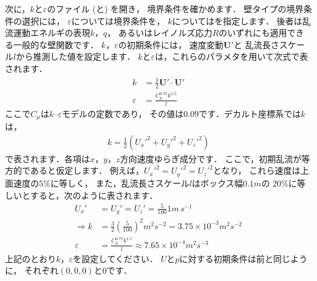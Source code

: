 次に，$k$と$\varepsilon$のファイル (と) を開き，
境界条件を確かめます．
壁タイプの境界条件の選択には，
$\varepsilon$については境界条件を，
$k$についてはを指定します．
後者は乱流運動エネルギの表現$k$，$q$，
あるいはレイノルズ応力$R$のいずれにも適用できる一般的な壁関数です．
$k$，$\varepsilon$の初期条件には，
速度変動$\bm{U}'$と
%
乱流長さスケール$l$から推測した値を設定します．
$k$と$\varepsilon$は，これらのパラメタを用いて次式で表されます．
\begin{align}
 \label{eq:2.8}
  k &= \frac{1}{2}\overline{\bm{U}' \cdot \bm{U}'} \\
 \label{eq:2.9}
 \varepsilon &= \frac{C_{\mu}^{0.75}k^{1.5}}{l}
\end{align}
ここで$C_{\mu}$は$k$--$\varepsilon$モデルの定数であり，
その値は$0.09$です．デカルト座標系では$k$は，
\begin{align}
 \label{eq:2.10}
 k = \frac{1}{2}({U_{x}'}^{2} + {U_{y}'}^{2} + {U_{z}'}^{2})
\end{align}
で表されます．各項は$x$，$y$，$z$方向速度ゆらぎ成分です．
ここで，初期乱流が等方的であると仮定します．
例えば，${U_{x}'}^{2} = {U_{y}'}^{2} = {U_{z}'}^{2}$となり，
これら速度は上面速度の$5\unit{\%}$に等しく，
また，乱流長さスケール$l$はボックス幅$0.1\unit{m}$の
$20\unit{\%}$に等しいとすると，次のように表されます．
\begin{align}
 \label{eq:2.11}
 U_{x}' &= U_{y}' = U_{z}' = \frac{5}{100}1\unit{m\,s^{-1}} \\
 \label{eq:2.12}
 \Rightarrow k &= \frac{3}{2}\left(\frac{5}{100}\right)^{2}\unit{m^{2}s^{-2}}
 = 3.75 \times 10^{-3}\unit{m^{2}s^{-2}} \\
 \label{eq:2.13}
 \varepsilon &= \frac{C_{\mu}^{0.75}k^{1.5}}{l}
 \approx 7.65 \times 10^{-4}\unit{m^{2}s^{-3}}
\end{align}
上記のとおり$k$，$\varepsilon$を設定してください．
$U$と$p$に対する初期条件は前と同じように，
それぞれ$(0, 0, 0)$と$0$です．

